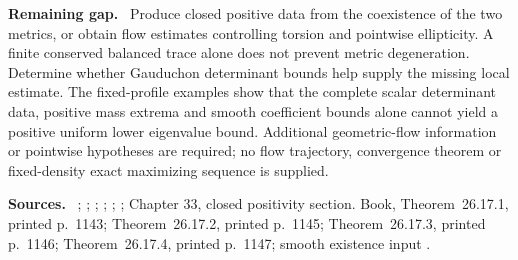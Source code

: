 \documentclass[11pt]{article}
\newcommand{\field}[1]{\par\medskip\noindent\textbf{#1.}\ }
\begin{document}
\field{Remaining gap} Produce closed positive data from the coexistence of the two metrics, or obtain flow estimates controlling torsion and pointwise ellipticity. A finite conserved balanced trace alone does not prevent metric degeneration. Determine whether Gauduchon determinant bounds help supply the missing local estimate. The fixed-profile examples show that the complete scalar determinant data, positive mass extrema and smooth coefficient bounds alone cannot yield a positive uniform lower eigenvalue bound. Additional geometric-flow information or pointwise hypotheses are required; no flow trajectory, convergence theorem or fixed-density exact maximizing sequence is supplied.
\field{Sources} \cite[Conjectures 1.1 and 1.2]{FV26}; \cite[Theorem 0.2 in the author manuscript]{Chiose14}; \cite[v1, Theorem 1.2; Lemmas 3.1--3.2 and Propositions 3.3--3.5; Propositions 4.2 and 4.5 and Lemmas 4.3--4.4]{CZParallel26}; \cite[v5, Theorem~8.11, Section~8.3, p.~41]{CavSKT13}; \cite[v1, Section~2.c, pp.~9--10]{SchAeppli07}; \cite[v1, Theorem~2.1, p.~7]{BarDef26}; Chapter 33, closed positivity section. Book, Theorem~26.17.1, printed p.~1143; Theorem~26.17.2, printed p.~1145; Theorem~26.17.3, printed p.~1146; Theorem~26.17.4, printed p.~1147; smooth existence input \cite[arXiv v2, Corollary~1, p.~1; final existence-reference paragraph p.~8]{TW10}.
\end{document}
